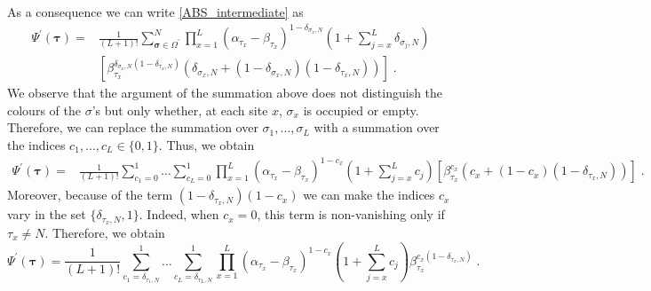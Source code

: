 \documentclass[10pt]{article}
\numberwithin{equation}{section}
\numberwithin{equation}{subsection}
\newcommand{\dt}{\;.}
\begin{document}
As a consequence we can write \eqref{ABS_intermediate} as 
\begin{align}
\Psi^{'}(\bm{\tau})%
=&\frac{1}{(L+1)!}\sum_{\bm{\sigma}\in \Omega^{'}}^{N}\prod_{x=1}^{L}\left(\alpha_{\tau_{x}}-\beta_{\tau_{x}}\right)^{1-\delta_{\sigma_{x},N}}\left(1+\sum_{j=x}^{L}\delta_{\sigma_{j},N}\right)\nonumber\\&\left[\beta_{\tau_{x}}^{\delta_{\sigma_{x},N}(1-\delta_{\tau_{x},N})}\left(\delta_{\sigma_{x},N}+(1-\delta_{\sigma_{x},N})(1-\delta_{\tau_{x},N})\right)\right]\dt
\end{align}
We observe that the argument of the summation above does not distinguish the colours of the $\sigma$'s but only whether, at each site $x$, $\sigma_{x}$ is occupied or empty. Therefore, we can replace the summation over $\sigma_{1},\ldots,\sigma_{L}$ with a summation over the indices  $c_{1},\ldots,c_{L}\in \{0,1\}$. Thus, we obtain 
\begin{align}
\Psi^{'}(\bm{\tau})	=&\frac{1}{(L+1)!}\sum_{c_{1}=0}^{1}\ldots\sum_{c_{L}=0}^{1}\prod_{x=1}^{L}\left(\alpha_{\tau_{x}}-\beta_{\tau_{x}}\right)^{1-c_{x}}\left(1+\sum_{j=x}^{L}c_{j}\right)\left[\beta_{\tau_{x}}^{c_{x}}\left(c_{x}+(1-c_{x})(1-\delta_{\tau_{x},N})\right)\right]\dt
\end{align}
Moreover, because of the term $(1-\delta_{\tau_{x},N})(1-c_{x})$ we can make the indices $c_{x}$ vary in the set $\{\delta_{\tau_{x},N},1\}$. Indeed, when $c_{x}=0$, this term is non-vanishing only if $\tau_{x}\neq N$. Therefore, we obtain 
\begin{equation}
	\Psi^{'}(\bm{\tau})=\frac{1}{(L+1)!}\sum_{c_{1}=\delta_{\tau_{1},N}}^{1}\ldots\sum_{c_{L}=\delta_{\tau_{L},N}}^{1}\prod_{x=1}^{L}\left(\alpha_{\tau_{x}}-\beta_{\tau_{x}}\right)^{1-c_{x}}\left(1+\sum_{j=x}^{L}c_{j}\right)\beta_{\tau_{x}}^{c_{x}(1-\delta_{\tau_{x},N})}\dt
\end{equation}
\end{document}
